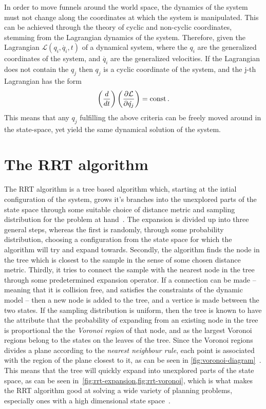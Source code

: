 In order to move funnels around the world space, the dynamics of the system must
not change along the coordinates at which the system is manipulated. This can be
achieved through the theory of cyclic and non-cyclic coordinates, stemming from
the Lagrangian dynamics of the system. Therefore, given the Lagrangian
\(\mathcal{L}(q_i, \dot{q_i}, t)\) of a dynamical system, where the \(q_i\) are
the generalized coordinates of the system, and \(\dot{q_i}\) are the
generalized velocities. If the Lagrangian does not contain the \(q_j\) then
\(q_j\) is a cyclic coordinate of the system, and the j-th Lagrangian has the
form
\[
  \left( \frac{d}{dt} \right) \left( \frac{\partial \mathcal{L}}{\partial
      \dot{q_j}} \right) = \mathrm{const} \, .
\]
This means that any \(q_j\) fulfilling the above criteria can be freely moved
around in the state-space, yet yield the same dynamical solution of the system.

\section{The RRT algorithm}
\label{sec:rrt-algorithm-intro}

The \ac{RRT} algorithm is a tree based algorithm which, starting at the intial
configuration of the system, grows it's branches into the unexplored parts of
the state space through some suitable choice of distance metric and sampling
distribution for the problem at hand~\cite{article}. The expansion is divided up
into three general steps, whereas the first is randomly, through some
probability distribution, choosing a configuration from the state space for
which the algorithm will try and expand towards. Secondly, the algorithm finds
the node in the tree which is closest to the sample in the sense of some chosen
distance metric. Thirdly, it tries to connect the sample with the nearest node
in the tree through some predetermined expansion operator. If a connection can
be made -- meaning that it is collision free, and satisfies the constraints of
the dynamic model -- then a new node is added to the tree, and a vertice is made
between the two states. If the sampling distribution is uniform, then the tree
is known to have the attribute that the probability of expanding from an
existing node in the tree is proportional the the \textit{Voronoi region} of
that node, and as the largest Voronoi regions belong to the states on the leaves
of the tree. Since the Voronoi regions divides a plane according to the
\textit{nearest neighbour rule}, each point is associated with the region of the
plane closest to it, as can be seen in
\cref{fig:voronoi-diagram}~\cite{aurenhammerVoronoiDiagramsSurvey1991}. This
means that the tree will quickly expand into unexplored parts of the state
space, as can be seen in~\cref{fig:rrt-expansion,fig:rrt-voronoi}, which is what
makes the \ac{RRT} algorithm good at solving a wide variety of planning
problems, especially ones with a high dimensional state space~\cite{Lav06}.

